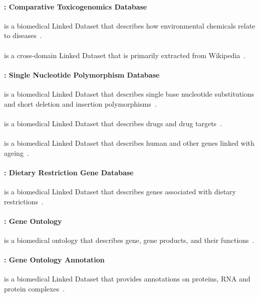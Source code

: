 \paragraph{\ctd: Comparative Toxicogenomics Database} is a biomedical Linked Dataset that describes how environmental chemicals relate to diseases~\cite{DumontierCCAEBD14}.

\paragraph{\dbpedia} is a cross-domain Linked Dataset that is primarily extracted from Wikipedia~\cite{LehmannIJJKMHMK15}.

\paragraph{\dbsnp: Single Nucleotide Polymorphism Database} is a biomedical Linked Dataset that describes single base nucleotide substitutions and short deletion and insertion polymorphisms~\cite{DumontierCCAEBD14}.

\paragraph{\drugbank} is a biomedical Linked Dataset that describes drugs and drug targets~\cite{DumontierCCAEBD14}.

\paragraph{\genage} is a biomedical Linked Dataset that describes human and other genes linked with ageing~\cite{DumontierCCAEBD14}.

\paragraph{\gendr: Dietary Restriction Gene Database} is a biomedical Linked Dataset that describes genes associated with dietary restrictions~\cite{DumontierCCAEBD14}.

\paragraph{\go: Gene Ontology} is a biomedical ontology that describes gene, gene products, and their functions~\cite{DumontierCCAEBD14}.

\paragraph{\goa: Gene Ontology Annotation} is a biomedical Linked Dataset that provides annotations on proteins, RNA and protein complexes~\cite{DumontierCCAEBD14}.

